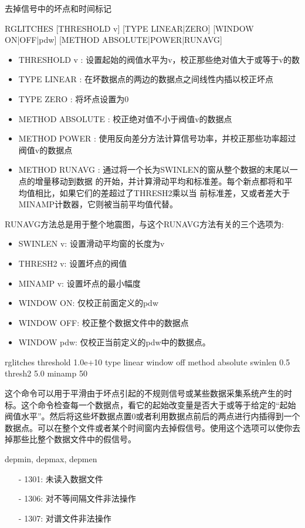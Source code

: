 \label{cmd:rglitches}

去掉信号中的坏点和时间标记

\begin{SACSTX}
RGLITCHES [THRESHOLD v] [TYPE LINEAR|ZERO] [WINDOW ON|OFF|pdw] [METHOD ABSOLUTE|POWER|RUNAVG]
\end{SACSTX}

\begin{itemize}
\item THRESHOLD v : 设置起始的阀值水平为v，校正那些绝对值大于或等于v的数
\item TYPE LINEAR : 在坏数据点的两边的数据点之间线性内插以校正坏点 
\item TYPE ZERO : 将坏点设置为0 
\item METHOD ABSOLUTE : 校正绝对值不小于阀值v的数据点 
\item METHOD POWER : 使用反向差分方法计算信号功率，并校正那些功率超过阀值v的数据点 
\item METHOD RUNAVG : 通过将一个长为SWINLEN的窗从整个数据的末尾以一点的增量移动到数据
    的开始，并计算滑动平均和标准差。每个新点都将和平均值相比，如果它们的差超过了THRESH2乘以当
    前标准差，又或者差大于MINAMP计数器，它则被当前平均值代替。
\end{itemize}
    
RUNAVG方法总是用于整个地震图，与这个RUNAVG方法有关的三个选项为:
\begin{itemize}
\item SWINLEN v: 设置滑动平均窗的长度为v
\item THRESH2 v: 设置坏点的阀值
\item MINAMP  v: 设置坏点的最小幅度
\item WINDOW ON: 仅校正前面定义的pdw
\item WINDOW OFF: 校正整个数据文件中的数据点
\item WINDOW pdw: 仅校正当前定义的pdw中的数据点。
\end{itemize} 

\begin{SACDFT}
rglitches threshold 1.0e+10 type linear window off method absolute 
    swinlen 0.5 thresh2 5.0 minamp 50
\end{SACDFT}

这个命令可以用于平滑由于坏点引起的不规则信号或某些数据采集系统产生的时标。这个命令检查每一个数据点，看它的起始改变量是否大于或等于给定的“起始阀值水平”。然后将这些坏数据点置0或者利用数据点前后的两点进行内插得到一个数据点。可以在整个文件或者某个时间窗内去掉假信号。使用这个选项可以使你去掉那些比整个数据文件中的假信号。

depmin, depmax, depmen

\begin{itemize}
\item[-]1301: 未读入数据文件
\item[-]1306: 对不等间隔文件非法操作
\item[-]1307: 对谱文件非法操作
\end{itemize}
